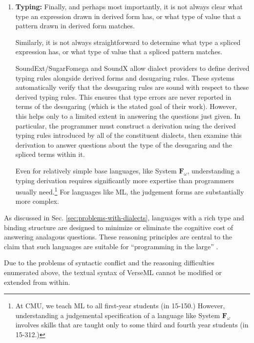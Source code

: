 {\begin{enumerate}
More flexible systems where desugarings are computed functionally, or language-external systems that have no understanding of binding structure, do not enforce context independence.

\item \textbf{Typing:} Finally, and perhaps most importantly, it is not always clear what type an expression drawn in derived form has, or what type of value that a pattern drawn in derived form matches.

Similarly, it is not always straightforward to determine what type a spliced expression has, or what type of value that a spliced pattern matches.

SoundExt/SugarFomega \cite{conf/popl/LorenzenE16} and SoundX \cite{conf/sle/RitschelE15} allow dialect providers to define derived typing rules alongside derived forms and desugaring rules. These systems automatically verify that the desugaring rules are sound with respect to these derived typing rules. This ensures that type errors are never reported in terms of the desugaring (which is the stated goal of their work). However, this helps only to a limited extent in answering the questions just given. In particular, the programmer must construct a derivation using the derived typing rules introduced by all of the constituent dialects, then examine this derivation to answer questions about the type of the desugaring and the spliced terms within it. 

Even for relatively simple base languages, like System $\mathbf{F}_\omega$, understanding a typing derivation requires significantly more expertise than programmers usually need.\footnote{At CMU, we teach ML to all first-year students (in 15-150.) However, understanding a judgemental specification of a language like System $\mathbf{F}_\omega$ involves skills that are taught only to some third and fourth year students (in 15-312.)} For languages like ML, the judgement forms are substantially more complex. 
\end{enumerate}

As discussed in Sec. \ref{sec:problems-with-dialects}, languages with a rich type and binding structure are designed to minimize or eliminate the cognitive cost of answering analagous questions. These reasoning principles are central to the claim that such languages are suitable for ``programming in the large'' \cite{DeRemer76}. 

Due to the problems of syntactic conflict and the reasoning difficulties enumerated above, the textual syntax of VerseML cannot be modified or extended from within.%

}
